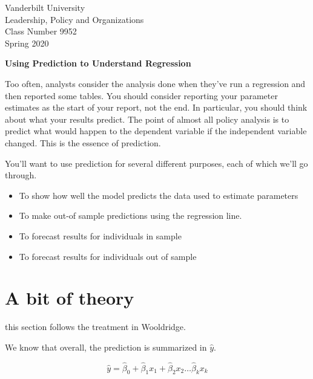 \documentclass[12pt]{article}
\begin{document}
\thispagestyle{empty}%

\setlength{\parskip}{1ex plus 0.5ex minus 0.2ex}

\setcounter{secnumdepth}{-2}

\begin{flushleft}
Vanderbilt University\\Leadership, Policy and Organizations\\Class Number 9952\\ Spring 2020\\
\end{flushleft}

\begin{center}
  \textbf{Using Prediction to Understand Regression}
\end{center}


Too often, analysts consider the analysis done when they've run a
regression and then reported some tables. You should consider
reporting your parameter estimates as the start of your report, not
the end. In particular, you should think about what your results
predict. The point of almost all policy analysis is to predict what
would happen to the dependent variable if the independent variable
changed. This is the essence of prediction. 

You'll want to use prediction for several different purposes, each of
which we'll go through.

\begin{itemize}
\item To show how well the model predicts the data used to estimate
  parameters
\item To make out-of sample predictions using the regression line.
\item To forecast results for individuals in sample
\item To forecast results for individuals out of sample
\end{itemize}



\section{A bit of theory}
\label{sec:bit-theory}

this section follows the treatment in Wooldridge. 

We know that overall, the prediction is summarized in $\hat{y}$. 

\begin{equation*}
  \hat{y}=\hat{\beta}_0+\hat{\beta}_1 x_1+ \hat{\beta}_2 x_2 \ldots \hat{\beta}_k x_k
\end{equation*}
\end{document}
